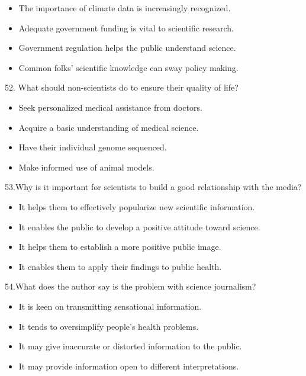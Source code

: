 \documentclass[UTF8,11pt]{ctexart}
\begin{document}
\begin{itemize}[leftmargin=2em,itemsep=.2em,topsep=.4em]\item[A.] The importance of climate data is increasingly recognized.
\item[B.] Adequate government funding is vital to scientific research.
\item[C.] Government regulation helps the public understand science.
\item[D.] Common folks’ scientific knowledge can sway policy making.
\end{itemize}

52. What should non-scientists do to ensure their quality of life?


\begin{itemize}[leftmargin=2em,itemsep=.2em,topsep=.4em]\item[A.] Seek personalized medical assistance from doctors.
\item[B.] Acquire a basic understanding of medical science.
\item[C.] Have their individual genome sequenced.
\item[D.] Make informed use of animal models.
\end{itemize}

53.Why is it important for scientists to build a good relationship with the media?


\begin{itemize}[leftmargin=2em,itemsep=.2em,topsep=.4em]\item[A.] It helps them to effectively popularize new scientific information.
\item[B.] It enables the public to develop a positive attitude toward science.
\item[C.] It helps them to establish a more positive public image.
\item[D.] It enables them to apply their findings to public health.
\end{itemize}

54.What does the author say is the problem with science journalism?


\begin{itemize}[leftmargin=2em,itemsep=.2em,topsep=.4em]\item[A.] It is keen on transmitting sensational information.
\item[B.] It tends to oversimplify people’s health problems.
\item[C.] It may give inaccurate or distorted information to the public.
\item[D.] It may provide information open to different interpretations.
\end{itemize}
\end{document}
